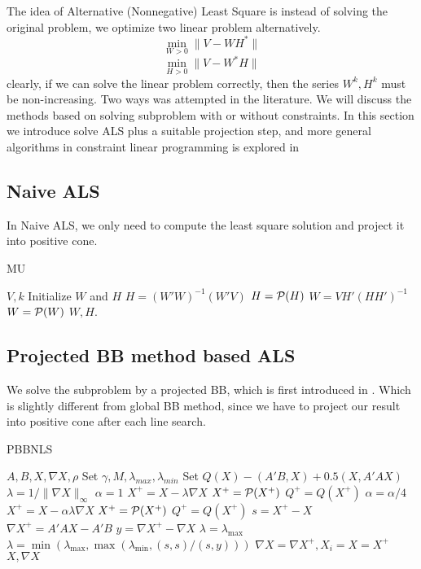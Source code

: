 \documentclass{article}
\renewcommand{\grad}{\nabla}
\begin{document}
The idea of Alternative (Nonnegative) Least Square is instead of solving the original problem, we optimize two linear problem alternatively.
\begin{equation}
\min_{W>0} \|V-WH^*\|
\end{equation}
\begin{equation}
\min_{H>0} \|V-W^*H\|
\end{equation}
clearly, if we can solve the linear problem correctly, then the series $W^k, H^k$ must be non-increasing. Two ways was attempted in the literature. We will discuss the methods based on solving subproblem with or without constraints. In this section we introduce solve ALS plus a suitable projection step, and more general algorithms in constraint linear programming is explored in 
\subsection{Naive ALS}
In Naive ALS, we only need to compute the least square solution and project it into positive cone.

\begin{algorithm}[H]
	\caption{MU}
	\begin{algorithmic}[1]
		\REQUIRE $V, k$
		\STATE Initialize $W$ and $H$ 
		\STATE $H = (W'W)^{-1}(W'V)$
		\STATE $H = \P(H)$
		\STATE $W = VH'(HH')^{-1}$
		\STATE $W = \P(W)$
		\ENDWHILE
		\STATE \Return $W,H$.
	\end{algorithmic}
\end{algorithm}


\subsection{Projected BB method based ALS}
We solve the subproblem by a projected BB, which is first introduced in \cite{apbb}. Which is slightly different from global BB method, since we have to project our result into positive cone after each line search.

\begin{algorithm}[H]
	\caption{PBBNLS}
	\begin{algorithmic}[1]
		\REQUIRE $A,B,X, \grad X,\rho$
		\STATE Set $\gamma, M, \lambda_{max}, \lambda_{min}$
		\STATE Set $Q(X) -(A'B,X) + 0.5 (X, A'AX)$
		\STATE $\lambda = 1/\|\grad X\|_{\infty}$
		\STATE $\alpha = 1$
		\STATE $X^+ = X - \lambda \grad X$
		\STATE $X^+ = \P(X^+)$
		\STATE $Q^+ = Q(X^+)$
		\WHILE{$\lambda > \lambda_{min}$ and $Q^+ < \max_{i-M<k<i}Q(X_i) + \gamma \alpha (\grad X, D)$}
		\STATE $\alpha = \alpha / 4$
		\STATE $X^+ = X - \alpha\lambda\grad X$
		\STATE $X^+ = \P(X^+)$
		\STATE $Q^+ = Q(X^+)$
		\ENDWHILE
		\STATE $s = X^+ - X$
		\STATE $\grad X^+ = A'AX-A'B$
		\STATE $y = \grad X^+ - \grad X$
		\STATE $\lambda = \lambda_{\max}$
		\ELSE
		\STATE $\lambda = \min(\lambda_{\max}, \max(\lambda_{\min}, (s,s)/(s,y)))$
		\ENDIF
		\STATE $\grad X = \grad X^+,X_i = X  = X^+$
		\ENDFOR
		\STATE \Return $X, \grad X$
	\end{algorithmic}
\end{algorithm}
\end{document}
